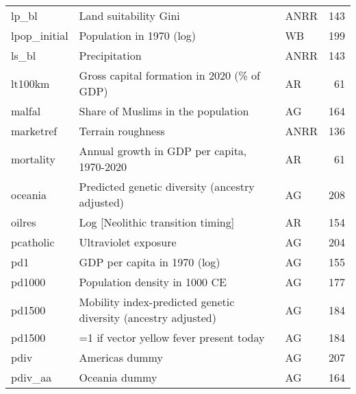 \begin{tabular}{lllr}
lp\_bl                          &                                                     Land suitability Gini &   ANRR &   143 \\
lpop\_initial                   &                                                  Population in 1970 (log) &     WB &   199 \\
ls\_bl                          &                                                             Precipitation &   ANRR &   143 \\
lt100km                        &                                Gross capital formation in 2020 (\% of GDP) &     AR &    61 \\
malfal                         &                                        Share of Muslims in the population &     AG &   164 \\
marketref                      &                                                         Terrain roughness &   ANRR &   136 \\
mortality                      &                                Annual growth in GDP per capita, 1970-2020 &     AR &    61 \\
oceania                        &                           Predicted genetic diversity (ancestry adjusted) &     AG &   208 \\
oilres                         &                                         Log [Neolithic transition timing] &     AR &   154 \\
pcatholic                      &                                                      Ultraviolet exposure &     AG &   204 \\
pd1                            &                                              GDP per capita in 1970 (log) &     AG &   155 \\
pd1000                         &                                             Population density in 1000 CE &     AG &   177 \\
pd1500                         &            Mobility index-predicted genetic diversity (ancestry adjusted) &     AG &   184 \\
pd1500                         &                                   =1 if vector yellow fever present today &     AG &   184 \\
pdiv                           &                                                            Americas dummy &     AG &   207 \\
pdiv\_aa                        &                                                             Oceania dummy &     AG &   164 \\

\end{tabular}
